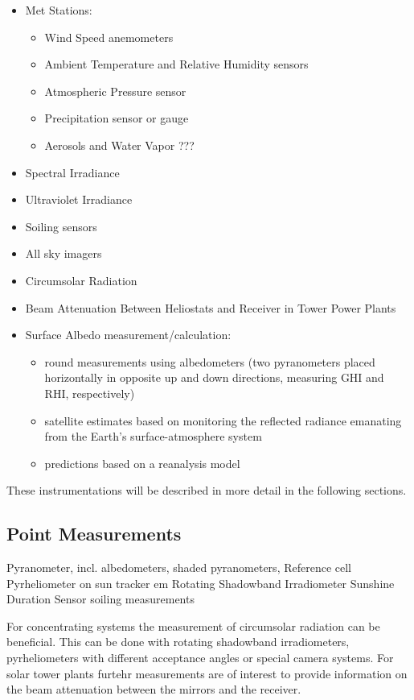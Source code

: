 \begin{itemize}
    \item Met Stations:
        \begin{itemize}
            \item Wind Speed anemometers
            \item Ambient Temperature and Relative Humidity sensors
            \item Atmospheric Pressure sensor
            \item Precipitation sensor or gauge
            \item Aerosols and Water Vapor ???
        \end{itemize}
   \item Spectral Irradiance 
   \item Ultraviolet Irradiance 
   \item Soiling sensors
   \item All sky imagers
   \item Circumsolar Radiation 
   \item Beam Attenuation Between Heliostats and Receiver in Tower Power Plants
   \item Surface Albedo measurement/calculation: 
         \begin{itemize}
            \item round measurements using albedometers (two pyranometers placed horizontally in opposite up and down directions, measuring GHI and RHI, respectively)
            \item satellite estimates based on monitoring the reflected radiance emanating from the Earth’s surface-atmosphere system
            \item predictions based on a reanalysis model
        \end{itemize}
\end{itemize}

These instrumentations will be described in more detail in the following sections. 

\subsection{Point Measurements }

  Pyranometer, incl. albedometers, shaded pyranometers, 
  Reference cell
  Pyrheliometer on sun tracker
  em Rotating Shadowband Irradiometer
Sunshine Duration Sensor
soiling measurements 

For  concentrating systems the measurement of circumsolar radiation can be beneficial. This can be done with rotating shadowband irradiometers, pyrheliometers with different acceptance angles or special camera systems. For solar tower plants furtehr measurements are of interest to provide information on the beam attenuation between the mirrors and the receiver.

